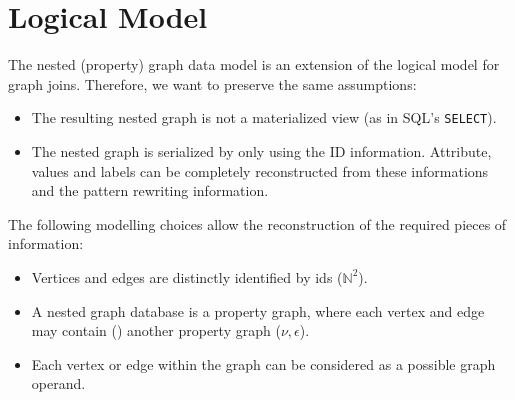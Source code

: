 \section{Logical Model}
\begin{multilucido}[Design]
	\begin{sottolucido}
		The nested (property) graph data model is an extension of the logical model for graph joins. Therefore, we want to preserve the same assumptions:
		\begin{itemize}
			\item The resulting nested graph is not a materialized view (as in SQL's \texttt{SELECT}).
			\item The nested graph is serialized by only using the ID information. Attribute, values and labels can be completely reconstructed from these informations and the pattern rewriting information.
		\end{itemize}
	\end{sottolucido}

\begin{sottolucido}
	The following modelling choices allow the reconstruction of the required pieces of information:
	\begin{itemize}
		[square]
		\item Vertices and edges are distinctly identified by ids ($\mathbb{N}^2$).
		\item A nested graph database is a property graph, where each vertex and edge may contain () another property graph ($\nu, \epsilon$).
		\item Each vertex or edge within the graph can be considered as a possible graph operand.
	\end{itemize}
\end{sottolucido}
\end{multilucido}





